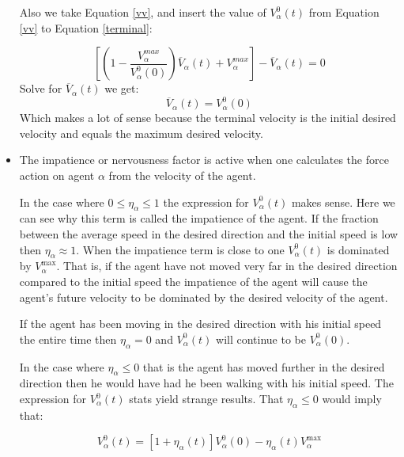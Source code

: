 \begin{itemize}
Also we take Equation \ref{vv}, and insert the value of $ V_{\alpha}^{0}(t) $ from Equation \ref{vv} to Equation \ref{terminal}:

\begin{equation}
	\left[ \left( 1 - \frac{V_{\alpha}^{max}}{V_{\alpha}^{0}(0)}\right)\overline{V}_{\alpha} \left( t \right) + V_{\alpha}^{max} \right] - \overline{V}_{\alpha} \left( t\right) 
    = 0
\end{equation}
Solve for $ \overline{V}_{\alpha} \left( t\right) $ we get:
\begin{equation}
\overline{V}_{\alpha} \left( t\right) = V_{\alpha}^{0}(0)
\end{equation}
Which makes a lot of sense because the terminal velocity is the initial desired velocity and equals the maximum desired velocity.

\item The impatience or nervousness factor is active when one calculates the 
force action on agent $\alpha$ from the velocity of the agent.

In the case where $0 \leq \eta_{\alpha} \leq 1$ the expression for 
$V_{\alpha}^{0} \left( t \right)$  makes sense. Here we can see why this term 
is called the impatience of the agent. If the fraction  between the average 
speed in the desired direction and the initial speed is low then $\eta_{\alpha} \approx 1$. 
When the impatience term is close to one $V_{\alpha}^{0} \left( t \right)$ 
is dominated by $V_{\alpha}^{\text{max}}$. That is, if the agent have not 
moved very far in the desired direction compared to the initial speed the 
impatience of the agent will cause the agent's future velocity to be dominated by 
the desired velocity of the agent.

If the agent has been moving in the desired direction with his initial 
speed the entire time then $\eta_{\alpha} = 0$  and 
$V_{\alpha}^{0} \left( t \right)$ will continue to be $V_{\alpha}^{0} \left( 0 \right)$.

In the case where $\eta_{\alpha} \leq 0$ that is the agent has moved further 
in the desired direction then he would have had he been walking with his 
initial speed. The expression for $V_{\alpha}^{0} \left( t \right)$
stats yield strange results. That $\eta_{\alpha} \leq 0$ would imply that:

\begin{equation}\label{n}
    V_{\alpha}^{0} \left( t\right) = \left[ 1 + \eta_{\alpha} \left( t \right) \right] 
    V_{\alpha}^{0} \left( 0 \right) -
    \eta_{\alpha} \left( t \right)V_{\alpha}^{\text{max}}
\end{equation}


\end{itemize}
